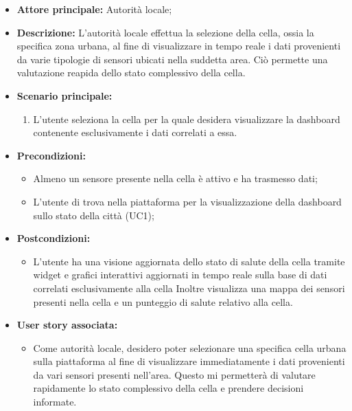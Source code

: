 \documentclass{article}
\begin{document}
\begin{itemize}
    \item \textbf{Attore principale:} Autorità locale;
    \item \textbf{Descrizione:} L'autorità locale effettua la selezione della cella, ossia la specifica zona urbana, al fine di visualizzare in tempo reale i dati provenienti da varie tipologie di sensori ubicati nella suddetta area. Ciò permette una valutazione reapida dello stato complessivo della cella.
    \item \textbf{Scenario principale:}
          \begin{enumerate}
              \item L'utente seleziona la cella per la quale desidera visualizzare la dashboard contenente esclusivamente i dati correlati a essa.
          \end{enumerate}
    \item \textbf{Precondizioni:}
          \begin{itemize}
              \item  Almeno un sensore presente nella cella è attivo e ha trasmesso dati;
              \item L'utente di trova  nella piattaforma per la visualizzazione della dashboard sullo stato della città (UC1);
          \end{itemize}
    \item \textbf{Postcondizioni:}
          \begin{itemize}
              \item  L'utente ha una visione aggiornata dello stato di salute della cella tramite widget e grafici interattivi aggiornati in tempo reale sulla base di dati correlati esclusivamente alla cella
                    Inoltre visualizza una mappa dei sensori presenti nella cella e un punteggio di salute relativo alla cella.
          \end{itemize}
    \item \textbf{User story associata:}
          \begin{itemize}
              \item Come autorità locale, desidero poter selezionare una specifica cella urbana sulla piattaforma al fine di visualizzare immediatamente i dati provenienti da vari sensori presenti nell'area. Questo mi permetterà di valutare rapidamente lo stato complessivo della cella e prendere decisioni informate.
          \end{itemize}
\end{itemize}
\end{document}
